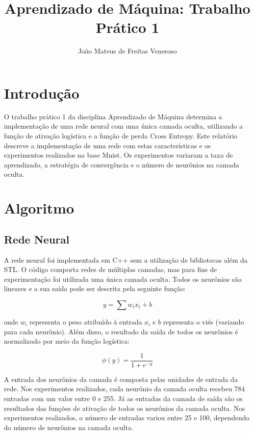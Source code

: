 \documentclass{report}
\begin{document}
\title{Aprendizado de Máquina: Trabalho Prático 1}
\author{João Mateus de Freitas Veneroso}

\maketitle

\tableofcontents

\chapter{Introdução}

O trabalho prático 1 da disciplina Aprendizado de Máquina determina a implementação de uma rede neural
com uma única camada oculta, utilizando a função de ativação logística e a função de perda Cross Entropy.
Este relatório descreve a implementação de uma rede com estas características e os experimentos realizados
na base Mnist. Os experimentos variaram a taxa de aprendizado, a estratégia de convergência e o número de 
neurônios na camada oculta.

\chapter{Algoritmo}

\section{Rede Neural}

A rede neural foi implementada em C++ sem a utilização de bibliotecas além da STL. O código comporta redes
de múltiplas camadas, mas para fins de experimentação foi utilizada uma única camada oculta. Todos os
neurônios são lineares e a sua saída pode ser descrita pela seguinte função:

\[ y = \sum w_ix_i + b \]

onde $w_i$ representa o peso atribuído à entrada $x_i$ e $b$ representa o viés (variando para cada neurônio). 
Além disso, o resultado da saída de todos os neurônios é normalizado por meio da função logística:

\[ \phi(y) = \frac{1}{1 + e^{-y}} \]

A entrada dos neurônios da camada é composta pelas unidades de entrada da rede. Nos experimentos
realizados, cada neurônio da camada oculta recebeu 784 entradas com um valor entre 0 e 255. Já as
entradas da camada de saída são os resultados das funções de ativação de todos os neurônios da camada oculta. Nos
experimentos realizados, o número de entradas variou entre 25 e 100, dependendo do número de neurônios na 
camada oculta.
\end{document}
